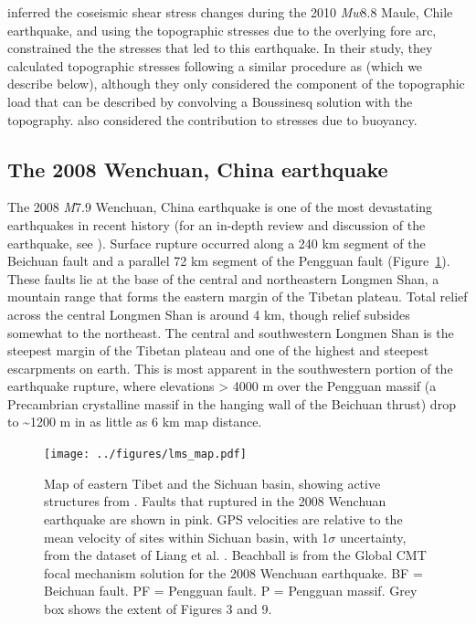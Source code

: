 \documentclass[twocolumn,jgrga]{AGUTeX}
\begin{document}
\begin{article}
\citet{luttrell2011} inferred the coseismic shear stress
changes during the 2010 \emph{Mw}8.8 Maule, Chile earthquake, and using
the topographic stresses due to the overlying fore arc, constrained the
the stresses that led to this earthquake. In their study, they
calculated topographic stresses following a similar procedure as
\citet{liuzoback1992} (which we describe below), although
they only considered the component of the topographic load that can be
described by convolving a Boussinesq solution with the topography.
\citet{luttrell2011} also considered the contribution to
stresses due to buoyancy.

\subsection{The 2008 Wenchuan, China
earthquake}\label{the-2008-wenchuan-china-earthquake}

The 2008 \emph{M}7.9 Wenchuan, China earthquake is one of the most
devastating earthquakes in recent history (for an in-depth review and
discussion of the earthquake, see \citet{zhang2010}).
Surface rupture occurred along a 240 km segment of the Beichuan fault
and a parallel 72 km segment of the Pengguan fault \citep{xu2009} 
(Figure~\ref{fig:lms_map}). These faults lie at the base of the central and
northeastern Longmen Shan, a mountain range that forms the eastern
margin of the Tibetan plateau. Total relief across the central Longmen
Shan is around 4 km, though relief subsides somewhat to the northeast.
The central and southwestern Longmen Shan is the steepest margin of the
Tibetan plateau \citep{clarkroyden2000} and one of the highest and
steepest escarpments on earth. This is most apparent in the southwestern
portion of the earthquake rupture, where elevations \textgreater{} 4000
m over the Pengguan massif (a Precambrian crystalline massif in the
hanging wall of the Beichuan thrust) drop to \textasciitilde{}1200 m in
as little as 6 km map distance.

\begin{figure}[ht!]
\texttt{[image: ../figures/lms\_map.pdf]}
\caption{Map of eastern Tibet and the Sichuan basin, showing active
structures from \citet{styron2010}. Faults that ruptured
in the 2008 Wenchuan earthquake are shown in pink. GPS velocities are
relative to the mean velocity of sites within Sichuan basin, with
1$\sigma$ uncertainty, from the dataset of Liang et al.
\citet{liang2013}. Beachball is from the Global CMT focal mechanism
solution for the 2008 Wenchuan earthquake. BF = Beichuan fault. PF =
Pengguan fault. P = Pengguan massif. Grey box shows the extent of
Figures 3 and 9.}
\label{fig:lms_map}
\end{figure}


\end{article}
\end{document}

